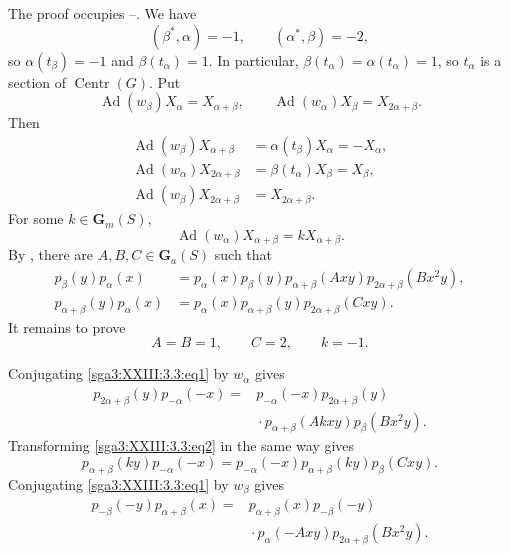 The proof occupies --. We have
\[
  (\beta^*,\alpha)=-1,\qquad(\alpha^*,\beta)=-2,
\]
so \(\alpha(t_\beta)=-1\) and \(\beta(t_\alpha)=1\). In particular,
\(\beta(t_\alpha)=\alpha(t_\alpha)=1\), so \(t_\alpha\) is a section
of \(\operatorname{Centr}(G)\). Put
\[
  \operatorname{Ad}(w_\beta)X_\alpha=X_{\alpha+\beta},
  \qquad
  \operatorname{Ad}(w_\alpha)X_\beta=X_{2\alpha+\beta}.
\]
Then
\[
\begin{aligned}
  \operatorname{Ad}(w_\beta)X_{\alpha+\beta}
    &=\alpha(t_\beta)X_\alpha=-X_\alpha,\\
  \operatorname{Ad}(w_\alpha)X_{2\alpha+\beta}
    &=\beta(t_\alpha)X_\beta=X_\beta,\\
  \operatorname{Ad}(w_\beta)X_{2\alpha+\beta}
    &=X_{2\alpha+\beta}.
\end{aligned}
\]
For some \(k\in\mathbf G_m(S)\),
\[
  \operatorname{Ad}(w_\alpha)X_{\alpha+\beta}
    =kX_{\alpha+\beta}.
\]
By , there are
\(A,B,C\in\mathbf G_a(S)\) such that
\begin{align}
  p_\beta(y)p_\alpha(x)
    &=p_\alpha(x)p_\beta(y)p_{\alpha+\beta}(Axy)
      p_{2\alpha+\beta}(Bx^2y), \tag{1}\label{sga3:XXIII:3.3:eq1}\\
  p_{\alpha+\beta}(y)p_\alpha(x)
    &=p_\alpha(x)p_{\alpha+\beta}(y)
      p_{2\alpha+\beta}(Cxy). \tag{2}\label{sga3:XXIII:3.3:eq2}
\end{align}
It remains to prove
\[
  A=B=1,\qquad C=2,\qquad k=-1.
\]

Conjugating \eqref{sga3:XXIII:3.3:eq1} by \(w_\alpha\) gives
\begin{equation}
\begin{aligned}
  p_{2\alpha+\beta}(y)p_{-\alpha}(-x)
    ={}&p_{-\alpha}(-x)p_{2\alpha+\beta}(y)\\
      &{}\cdot p_{\alpha+\beta}(Akxy)p_\beta(Bx^2y).
\end{aligned}
\tag{3}\label{sga3:XXIII:3.3:eq3}
\end{equation}
Transforming \eqref{sga3:XXIII:3.3:eq2} in the same way gives
\begin{equation}
  p_{\alpha+\beta}(ky)p_{-\alpha}(-x)
   =p_{-\alpha}(-x)p_{\alpha+\beta}(ky)p_\beta(Cxy).
\tag{4}\label{sga3:XXIII:3.3:eq4}
\end{equation}
Conjugating \eqref{sga3:XXIII:3.3:eq1} by \(w_\beta\) gives
\begin{equation}
\begin{aligned}
  p_{-\beta}(-y)p_{\alpha+\beta}(x)
    ={}&p_{\alpha+\beta}(x)p_{-\beta}(-y)\\
      &{}\cdot p_\alpha(-Axy)p_{2\alpha+\beta}(Bx^2y).
\end{aligned}
\tag{5}\label{sga3:XXIII:3.3:eq5}
\end{equation}


